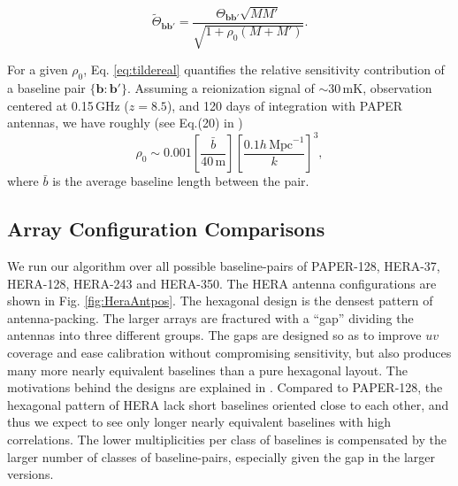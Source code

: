 \documentclass[twocolumn,apj,numberedappendix]{emulateapj}
\renewcommand\[{\begin{equation}}
\renewcommand\]{\end{equation}}
\begin{document}
\begin{equation}
\label{eq:tildereal}
\widetilde{\Theta}_{\boldsymbol{bb'}} =\frac{\Theta_{\boldsymbol{bb'}}\sqrt{MM'}}{\sqrt{1 + \rho_0 \left(M+M' \right)}}.
\end{equation}

For a given $\rho_0$, Eq. \eqref{eq:tildereal} quantifies the relative sensitivity contribution of a baseline pair $\{\boldsymbol{b}:\boldsymbol{b'}\}$. Assuming a reionization signal of $\sim 30\,\text{mK}$, observation centered at 0.15\,GHz ($z=8.5$), and 120 days of integration with PAPER antennas, we have roughly
(see Eq.(20) in \cite{first-paper})
\begin{equation}
\rho_0 \sim 0.001\left[\frac{\bar{b}}{40\,\text{m}}\right] \left[\frac{0.1h\,\text{Mpc}^{-1}}{k}\right]^3, 
\end{equation}
where $\bar{b}$ is the average baseline length between the pair.  

\subsection{Array Configuration Comparisons \label{sec:arrconf}}
We run our algorithm over all possible baseline-pairs of  PAPER-128, HERA-37, HERA-128, HERA-243 and HERA-350. The HERA antenna configurations are shown in Fig. \ref{fig:HeraAntpos}. The  
hexagonal design is the densest pattern of antenna-packing. The larger arrays are fractured with a ``gap'' dividing the antennas into three different groups. The gaps are designed so as to improve $uv$ coverage and ease calibration without compromising sensitivity, but also produces many more nearly equivalent baselines than a pure hexagonal layout. The motivations behind the designs are explained in \cite{HERAconfiguration}.  Compared to PAPER-128, the hexagonal pattern of HERA lack short baselines oriented close to each other, and thus we expect to see only longer nearly equivalent baselines with high correlations. The lower multiplicities per class of baselines is compensated by the larger number of classes of baseline-pairs, especially given the gap in the larger versions. 
\end{document}
